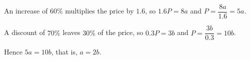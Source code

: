 An increase of $60\%$ multiplies the price by $1.6$, so $1.6P=8a$ and $P=\dfrac{8a}{1.6}=\boxed{5a}$.

A discount of $70\%$ leaves $30\%$ of the price, so $0.3P=3b$ and $P=\dfrac{3b}{0.3}=\boxed{10b}$.

Hence $5a=10b$, that is, $\boxed{a=2b}$.
